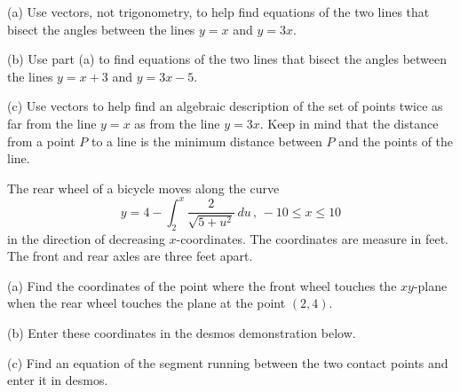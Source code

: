 \documentclass{ximera}
\begin{document}
\begin{question}   \label{Q6547:Vectors}
(a) Use vectors, not trigonometry, to help find equations of the two lines that bisect the angles between the lines $y=x$ and $y=3x$.

(b) Use part (a) to find equations of the two lines that bisect the angles between the lines $y=x+3$ and $y=3x-5$.
\end{question}

(c) Use vectors to help find an algebraic description of the set of points twice as far from the line $y=x$ as from the line $y=3x$. Keep in mind that the distance from a point $P$ to a line is the minimum distance between $P$ and the points of the line. 



\begin{question} \label{Q5704r:Vectors}
The rear wheel of a bicycle moves along the curve
\[
    y = 4 -\int_2^x \frac{2}{\sqrt{5+u^2}}\, du \, , \, -10 \leq x \leq 10 
\]
in the direction of decreasing $x$-coordinates. The coordinates are measure in feet. The front and rear axles are three feet apart.

(a) Find the coordinates of the point where the front wheel touches the $xy$-plane when the rear wheel touches the plane at the point $(2,4)$. 

(b) Enter these coordinates in the desmos demonstration below. 

(c) Find an equation of the segment running between the two contact points and enter it in desmos.

 
\begin{onlineOnly}
    \begin{center}
\end{center}
\end{onlineOnly}

\end{question}
\end{document}
